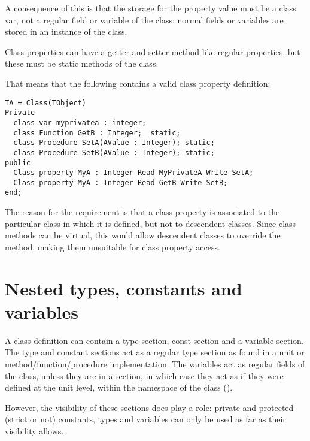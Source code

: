 A consequence of this is that the storage for the property value must be a
class var, not a regular field or variable of the class: normal fields or
variables are stored in an instance of the class.

Class properties can have a getter and setter method like regular
properties, but these must be static methods of the class. 

That means that the following contains a valid class property definition:
\begin{verbatim}
TA = Class(TObject)
Private
  class var myprivatea : integer;
  class Function GetB : Integer;  static;
  class Procedure SetA(AValue : Integer); static;
  class Procedure SetB(AValue : Integer); static;
public
  Class property MyA : Integer Read MyPrivateA Write SetA;
  Class property MyA : Integer Read GetB Write SetB;
end;
\end{verbatim}
The reason for the requirement is that a class property is associated to
the particular class in which it is defined, but not to descendent classes. 
Since class methods can be virtual, this would allow descendent classes 
to override the method, making them unsuitable for class property access.




\section{Nested types, constants and variables}
A class definition can contain a type section, const section and a variable section.
The type and constant sections act as a regular type section as found in a unit or 
method/function/procedure implementation. The variables act as regular fields of the 
class, unless they are in a  section, in which case they act as if they 
were defined at the unit level, within the namespace of the class ().

However, the visibility of these sections does play a role: private and protected 
(strict or not) constants, types and variables can only be used as far as their 
visibility allows.

